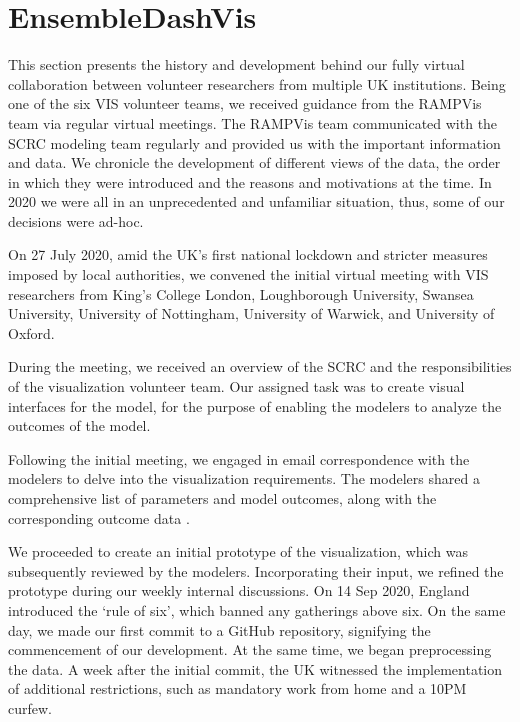 \section{EnsembleDashVis}
\label{sec:EnsembleDashVis}

This section presents the history and development behind our fully virtual collaboration between volunteer researchers from multiple UK institutions.
Being one of the six VIS volunteer teams, we received guidance from the RAMPVis team via regular virtual meetings. The RAMPVis team communicated with the SCRC modeling team regularly and provided us with the important information and data.
We chronicle the development of different views of the data, the order in which they were introduced and the reasons and motivations at the time.
In 2020 we were all in an unprecedented and unfamiliar situation, thus, some of our decisions were ad-hoc.


\label{subsec:InitialMeeting}
On 27 July 2020, amid the UK's first national lockdown and stricter measures imposed by local authorities, we convened the initial virtual meeting with VIS researchers from King's College London, Loughborough University, Swansea University, University of Nottingham, University of Warwick, and University of Oxford.

During the meeting, we received an overview of the SCRC and the responsibilities of the visualization volunteer team.
Our assigned task was to create visual interfaces for the model, for the purpose of enabling the modelers to analyze the outcomes of the model.

Following the initial meeting, we engaged in email correspondence with the modelers to delve into the visualization requirements. The modelers shared a comprehensive list of parameters and model outcomes, along with the corresponding outcome data \cite{2020Covid19}.


We proceeded to create an initial prototype of the visualization, which was subsequently reviewed by the modelers.
Incorporating their input, we refined the prototype during our weekly internal discussions.
On 14 Sep 2020, England introduced the `rule of six', which banned any gatherings above six.
On the same day, we made our first commit to a GitHub repository, signifying the commencement of our development.
At the same time, we began preprocessing the data.
A week after the initial commit, the UK witnessed the implementation of additional restrictions, such as mandatory work from home and a 10PM curfew.

